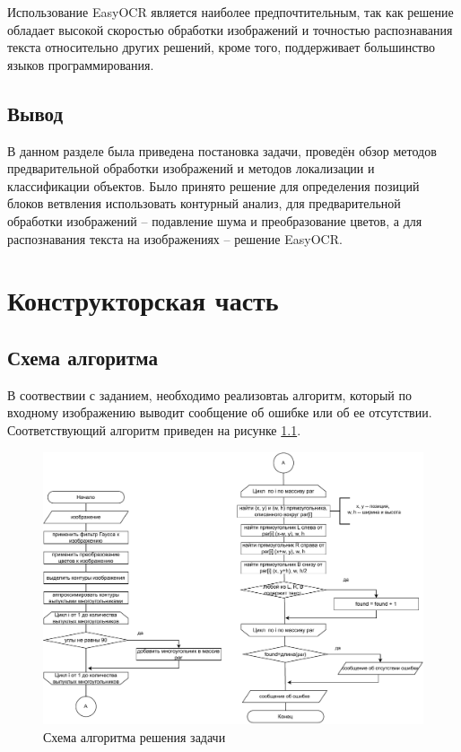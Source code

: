 \documentclass[12pt]{report}
\begin{document}
Использование EasyOCR является наиболее предпочтительным, так как решение обладает высокой скоростью обработки изображений и точностью распознавания текста относительно других решений, кроме того, поддерживает большинство языков программирования.

\section*{Вывод}
В данном разделе была приведена постановка задачи, проведён обзор методов предварительной обработки изображений и методов локализации и классификации объектов. Было принято решение для определения позиций блоков ветвления использовать контурный анализ, для предварительной обработки изображений -- подавление шума и преобразование цветов, а для распознавания текста на изображениях -- решение EasyOCR.
\clearpage

\chapter{Конструкторская часть}
\section{Схема алгоритма}
В соотвествии с заданием, необходимо реализовтаь алгоритм, который по входному изображению выводит сообщение об ошибке или об ее отсутствии. Соответствующий алгоритм приведен на рисунке \ref{fig:algo}.

\begin{figure}[h!]
  \centering
  \includegraphics[width = \linewidth]{algo.pdf}
  \caption{Схема алгоритма решения задачи}
  \label{fig:algo}
\end{figure}
\end{document}

